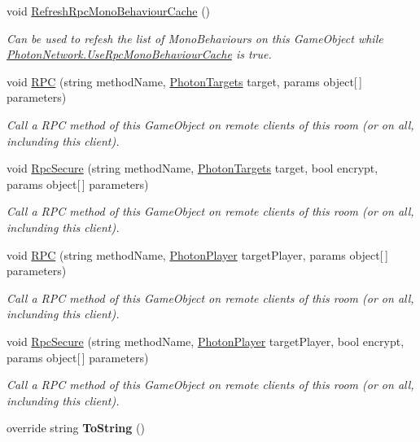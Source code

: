 \begin{DoxyCompactItemize}
\item 
void \hyperlink{class_photon_view_a869710e081df022bbb4fa160e7ab9e0a}{Refresh\+Rpc\+Mono\+Behaviour\+Cache} ()
\begin{DoxyCompactList}\small\item\em Can be used to refesh the list of Mono\+Behaviours on this Game\+Object while \hyperlink{class_photon_network_a2ea887525d418e088bf99d303673d2f3}{Photon\+Network.\+Use\+Rpc\+Mono\+Behaviour\+Cache} is true. \end{DoxyCompactList}\item 
void \hyperlink{class_photon_view_ad288db13a15d581e0f7c5886f4036720}{R\+PC} (string method\+Name, \hyperlink{group__public_api_gab84b274b6aa3b3a3d7810361da16170f}{Photon\+Targets} target, params object\mbox{[}$\,$\mbox{]} parameters)
\begin{DoxyCompactList}\small\item\em Call a R\+PC method of this Game\+Object on remote clients of this room (or on all, inclunding this client). \end{DoxyCompactList}\item 
void \hyperlink{class_photon_view_a2950cb34198fa050a7e65a6b2f722c68}{Rpc\+Secure} (string method\+Name, \hyperlink{group__public_api_gab84b274b6aa3b3a3d7810361da16170f}{Photon\+Targets} target, bool encrypt, params object\mbox{[}$\,$\mbox{]} parameters)
\begin{DoxyCompactList}\small\item\em Call a R\+PC method of this Game\+Object on remote clients of this room (or on all, inclunding this client). \end{DoxyCompactList}\item 
void \hyperlink{class_photon_view_a6bc9726af14a8c7b8bdd7793c495a6e8}{R\+PC} (string method\+Name, \hyperlink{class_photon_player}{Photon\+Player} target\+Player, params object\mbox{[}$\,$\mbox{]} parameters)
\begin{DoxyCompactList}\small\item\em Call a R\+PC method of this Game\+Object on remote clients of this room (or on all, inclunding this client). \end{DoxyCompactList}\item 
void \hyperlink{class_photon_view_ab6f075ebed73c05fa1c9ea6e81b66cca}{Rpc\+Secure} (string method\+Name, \hyperlink{class_photon_player}{Photon\+Player} target\+Player, bool encrypt, params object\mbox{[}$\,$\mbox{]} parameters)
\begin{DoxyCompactList}\small\item\em Call a R\+PC method of this Game\+Object on remote clients of this room (or on all, inclunding this client). \end{DoxyCompactList}\item 
override string {\bfseries To\+String} ()\hypertarget{class_photon_view_aaa61ad448b005df342350762476e367d}{}\label{class_photon_view_aaa61ad448b005df342350762476e367d}

\end{DoxyCompactItemize}
